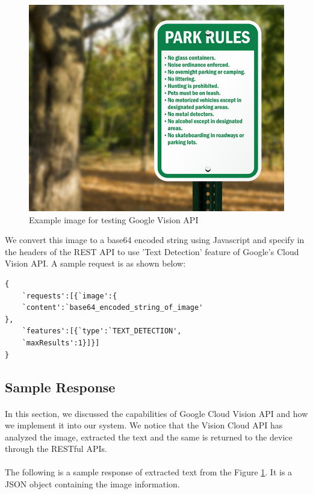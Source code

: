 \documentclass[12pt]{article}
\begin{document}
\begin{figure}[H]
	\centering
	\includegraphics[width=1.0\linewidth]{media/request_sample.png}
	\caption{Example image for testing Google Vision API}
	\label{fig:request_sample}
\end{figure} 

We convert this image to a base64 encoded string using Javascript and specify in the headers of the REST API to use 'Text Detection' feature of Google's Cloud Vision API. A sample request is as shown below:

\begin{lstlisting}
{
	`requests':[{`image':{
	`content':`base64_encoded_string_of_image'
},	
	`features':[{`type':`TEXT_DETECTION',
	`maxResults':1}]}]
}
\end{lstlisting}

\subsection{Sample Response}

\paragraph{} In this section, we discussed the capabilities of Google Cloud Vision API and how we implement it into our system. We notice that the Vision Cloud API has analyzed the image, extracted the text and the same is returned to the device through the RESTful APIs.  

\paragraph{}The following is a sample response of extracted text from the Figure \ref{fig:request_sample}. It is a JSON object containing the image information.
\end{document}
